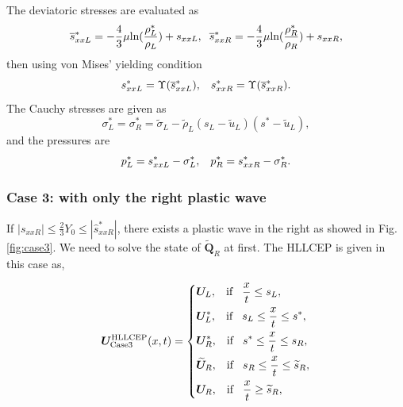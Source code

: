 \documentclass{article}
\numberwithin{equation}{section}
\numberwithin{table}{section}
\begin{document}
The deviatoric stresses are evaluated as
\begin{equation}
  \overline{s}_{xxL}^*=-\frac{4}{3}\mu\text{ln}(\frac{\rho_L^*}{\rho_L})+s_{xxL},\hspace{0.2cm}  \overline{s}_{xxR}^*=-\frac{4}{3}\mu\text{ln}(\frac{\rho_R^*}{\rho_R})+s_{xxR},
\end{equation}
then using von Mises' yielding condition
\begin{equation}
  s_{xxL}^* = \Upsilon(\overline{s}_{xxL}^*), \hspace{0.3cm}  s_{xxR}^* = \Upsilon(\overline{s}_{xxR}^*).
\end{equation}
The Cauchy stresses are given as
\begin{equation}
  \sigma_L^*=\sigma_R^*=\widetilde{\sigma}_L -\widetilde{\rho}_L (s_L-\widetilde{u}_L)(s^*-\widetilde{u}_L),
\end{equation}
and the pressures are
\begin{equation}
  p_L^* = s_{xxL}^* - \sigma_L^*, \hspace{0.3cm}   p_R^* = s_{xxR}^* - \sigma_R^*.
\end{equation}

\subsubsection {Case 3: with only the  right plastic wave}\label{sec:case3}
If  $|s_{xxR}| \le \frac{2}{3}Y_0 \le  |\hat{s}_{xxR}^*|$, there exists a plastic wave in the right as showed in Fig.\ref{fig:case3}. We need to solve the state  of $\widetilde{\bm{Q}}_R$ at first. The HLLCEP is given in this case as,

 \begin{equation}\label{eq:HLLCEP3}
   \bm{U}^{\text{HLLCEP}}_{\text{Case3}}(x,t) = \left\{ \begin{aligned}
		& \bm{U}_L, \hspace{0.3cm} \text{if} \hspace{0.3cm} \frac{x}{t}\le s_L, \\
		& \bm{U}_L^*, \hspace{0.3cm} \text{if} \hspace{0.3cm} s_L \le \frac{x}{t} \le s^*, \\
		& \bm{U}_R^*, \hspace{0.3cm} \text{if} \hspace{0.3cm} s^*\le \frac{x}{t} \le s_R, \\
		& \widetilde{\bm{U}}_R, \hspace{0.3cm} \text{if} \hspace{0.3cm} s_R \le \frac{x}{t} \le \widetilde{s}_R,\\
		& \bm{U}_R, \hspace{0.3cm} \text{if} \hspace{0.3cm} \frac{x}{t}\ge \widetilde{s}_R, \\
	  \end{aligned}
	\right.
  \end{equation}
\end{document}
